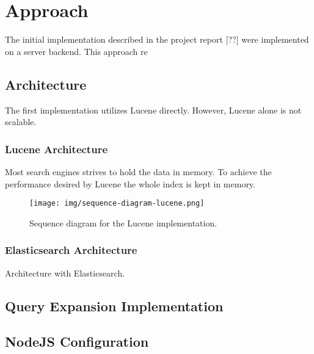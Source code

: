 \chapter{Approach}
\label{ch:approach}
The initial implementation described in the project report [??] were implemented on a server backend.
This approach re

\section{Architecture}
The first implementation utilizes Lucene directly.
However, Lucene alone is not scalable.

\subsection{Lucene Architecture}
Most search engines strives to hold the data in memory.
To achieve the performance desired by Lucene the whole index is kept in memory.

\begin{figure}[h!]
\centering \texttt{[image: img/sequence-diagram-lucene.png]}
\caption{Sequence diagram for the Lucene implementation.}
\label{fig:sequence-diagram-lucene}
\end{figure}

\subsection{Elasticsearch Architecture}
Architecture with Elasticsearch.

\section{Query Expansion Implementation}

\section{NodeJS Configuration}
